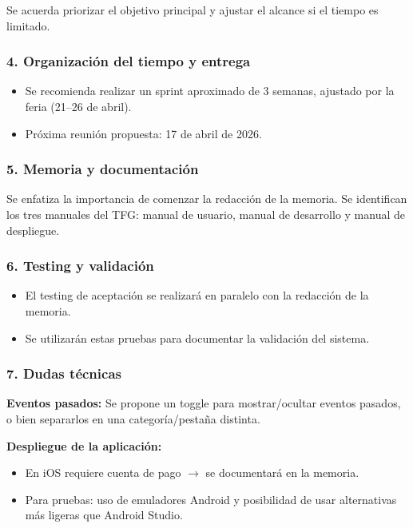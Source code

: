 Se acuerda priorizar el objetivo principal y ajustar el alcance si el tiempo es limitado.

\subsubsection*{4. Organización del tiempo y entrega}
\begin{itemize}
    \item Se recomienda realizar un sprint aproximado de 3 semanas, ajustado por la feria (21--26 de abril).
    \item Próxima reunión propuesta: 17 de abril de 2026.
\end{itemize}

\subsubsection*{5. Memoria y documentación}
Se enfatiza la importancia de comenzar la redacción de la memoria. Se identifican los tres manuales del TFG: manual de usuario, manual de desarrollo y manual de despliegue.

\subsubsection*{6. Testing y validación}
\begin{itemize}
    \item El testing de aceptación se realizará en paralelo con la redacción de la memoria.
    \item Se utilizarán estas pruebas para documentar la validación del sistema.
\end{itemize}

\subsubsection*{7. Dudas técnicas}

\textbf{Eventos pasados:} Se propone un toggle para mostrar/ocultar eventos pasados, o bien separarlos en una categoría/pestaña distinta.

\textbf{Despliegue de la aplicación:}
\begin{itemize}
    \item En iOS requiere cuenta de pago $\rightarrow$ se documentará en la memoria.
    \item Para pruebas: uso de emuladores Android y posibilidad de usar alternativas más ligeras que Android Studio.
\end{itemize}

